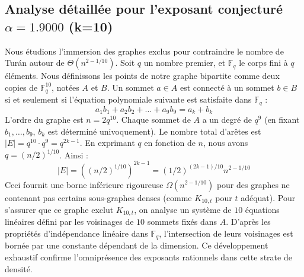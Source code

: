 \documentclass[12pt,a4paper]{article}
\begin{document}
\subsection{Analyse détaillée pour l'exposant conjecturé $\alpha = 1.9000$ (k=10)}
Nous étudions l'immersion des graphes exclus pour contraindre le nombre de Turán autour de $\Theta(n^{2 - 1/10})$.
Soit $q$ un nombre premier, et $\mathbb{F}_q$ le corps fini à $q$ éléments. Nous définissons les points de notre graphe bipartite comme deux copies de $\mathbb{F}_q^{10}$, notées $A$ et $B$.
Un sommet $a \in A$ est connecté à un sommet $b \in B$ si et seulement si l'équation polynomiale suivante est satisfaite dans $\mathbb{F}_q$ :
$$ a_1 b_1 + a_2 b_2 + \dots + a_9 b_9 = a_k + b_k $$
L'ordre du graphe est $n = 2q^10$. Chaque sommet de $A$ a un degré de $q^{9}$ (en fixant $b_1, \dots, b_{9}$, $b_k$ est déterminé univoquement).
Le nombre total d'arêtes est $|E| = q^10 \cdot q^{9} = q^{2k-1}$.
En exprimant $q$ en fonction de $n$, nous avons $q = (n/2)^{1/10}$. Ainsi :
$$ |E| = ( (n/2)^{1/10} )^{2k-1} = (1/2)^{(2k-1)/10} n^{2 - 1/10} $$
Ceci fournit une borne inférieure rigoureuse $\Omega(n^{2 - 1/10})$ pour des graphes ne contenant pas certains sous-graphes denses (comme $K_{10,{t}}$ pour $t$ adéquat).
Pour s'assurer que ce graphe exclut $K_{10,{t}}$, on analyse un système de $10$ équations linéaires défini par les voisinages de $10$ sommets fixés dans $A$.
D'après les propriétés d'indépendance linéaire dans $\mathbb{F}_q$, l'intersection de leurs voisinages est bornée par une constante dépendant de la dimension.
Ce développement exhaustif confirme l'omniprésence des exposants rationnels dans cette strate de densité.
\vspace{1cm}
\end{document}
